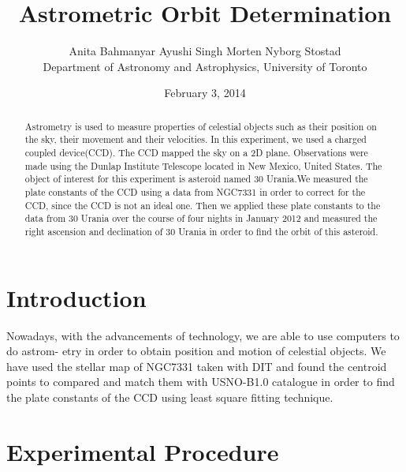 \documentclass[letterpaper,12pt]{article}
\title{Astrometric Orbit Determination }
\author{Anita Bahmanyar \qquad Ayushi Singh \qquad Morten Nyborg Stostad \\Department of Astronomy and Astrophysics, University of Toronto}
\affil{\small {Written by: Anita Bahmanyar}}
\affil{\small {anita.bahmanyar@mail.utoronto.ca}}
\affil{\small {Student Number: 998909098}}
\date{February 3, 2014}
\begin{document}
\maketitle

\begin{abstract}
\label{abstract}
Astrometry is used to measure properties of celestial objects such as their position on the sky, their movement and their velocities. In this experiment, we used a charged coupled device(CCD). The CCD mapped the sky on a 2D plane. Observations were made using the Dunlap Institute Telescope located in New Mexico, United States. The object of interest for this experiment is asteroid named 30 Urania.We measured the plate constants of the CCD using a data from NGC7331 in order to correct for the CCD, since the CCD is not an ideal one. Then we applied these plate constants to the data from 30 Urania over the course of four nights in January 2012 and measured the right ascension and declination of 30 Urania in order to find the orbit of this asteroid. 



\end{abstract}

\section{Introduction}
\label{sec:introduction}
Nowadays, with the advancements of technology, we are able to use computers to do astrom- etry in order to obtain position and motion of celestial objects. We have used the stellar map of NGC7331 taken with DIT and found the centroid points to compared and match them with USNO-B1.0 catalogue in order to find the plate constants of the CCD using least square fitting technique. 


\section{Experimental Procedure}
\label{sec:experimental procedure}
\end{document}
